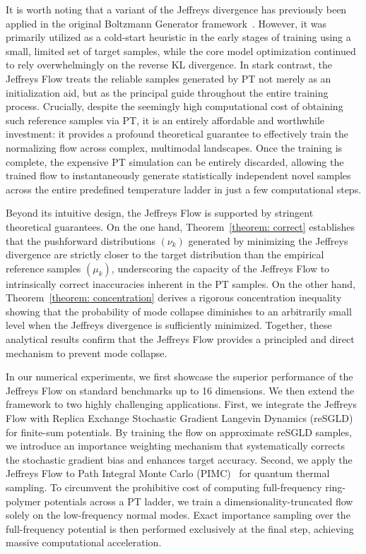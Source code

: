 \documentclass[%
 reprint,
 amsmath,amssymb,
 aps,
 pre,
]{revtex4-2}
\begin{document}
It is worth noting that a variant of the Jeffreys divergence has previously been applied in the original Boltzmann Generator framework~\cite{noe2019boltzmann}. However, it was primarily utilized as a cold-start heuristic in the early stages of training using a small, limited set of target samples, while the core model optimization continued to rely overwhelmingly on the reverse KL divergence. In stark contrast, the Jeffreys Flow treats the reliable samples generated by PT not merely as an initialization aid, but as the principal guide throughout the entire training process. Crucially, despite the seemingly high computational cost of obtaining such reference samples via PT, it is an entirely affordable and worthwhile investment: it provides a profound theoretical guarantee to effectively train the normalizing flow across complex, multimodal landscapes. Once the training is complete, the expensive PT simulation can be entirely discarded, allowing the trained flow to instantaneously generate statistically independent novel samples across the entire predefined temperature ladder in just a few computational steps.

Beyond its intuitive design, the Jeffreys Flow is supported by stringent theoretical guarantees. On the one hand, Theorem~\ref{theorem: correct} establishes that the pushforward distributions $(\nu_k)$ generated by minimizing the Jeffreys divergence are strictly closer to the target distribution than the empirical reference samples $(\mu_k)$, underscoring the capacity of the Jeffreys Flow to intrinsically correct inaccuracies inherent in the PT samples. On the other hand, Theorem~\ref{theorem: concentration} derives a rigorous concentration inequality showing that the probability of mode collapse diminishes to an arbitrarily small level when the Jeffreys divergence is sufficiently minimized. Together, these analytical results confirm that the Jeffreys Flow provides a principled and direct mechanism to prevent mode collapse.

In our numerical experiments, we first showcase the superior performance of the Jeffreys Flow on standard benchmarks up to 16 dimensions. We then extend the framework to two highly challenging applications. First, we integrate the Jeffreys Flow with Replica Exchange Stochastic Gradient Langevin Dynamics (reSGLD)~\cite{deng2020accelerating,li2023fast,lin2023b} for finite-sum potentials. By training the flow on approximate reSGLD samples, we introduce an importance weighting mechanism that systematically corrects the stochastic gradient bias and enhances target accuracy. Second, we apply the Jeffreys Flow to Path Integral Monte Carlo (PIMC)~\cite{herman1982path,marx1996ab,ceriotti2010efficient,schoof2011configuration} for quantum thermal sampling. To circumvent the prohibitive cost of computing full-frequency ring-polymer potentials across a PT ladder, we train a dimensionality-truncated flow solely on the low-frequency normal modes. Exact importance sampling over the full-frequency potential is then performed exclusively at the final step, achieving massive computational acceleration.
\end{document}
